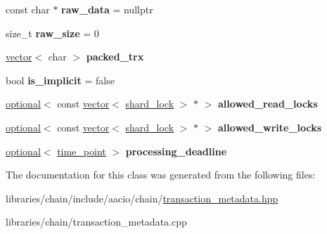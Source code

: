 \begin{DoxyCompactItemize}
const char $\ast$ {\bfseries raw\+\_\+data} = nullptr
\item 
\mbox{\label{classaacio_1_1chain_1_1transaction__metadata_a6cb9fee5c517464b981a4edef50c93be}} 
size\+\_\+t {\bfseries raw\+\_\+size} = 0
\item 
\mbox{\label{classaacio_1_1chain_1_1transaction__metadata_a115fa4fd227e7172759c1c612b4fe0af}} 
\mbox{\hyperlink{classstd_1_1vector}{vector}}$<$ char $>$ {\bfseries packed\+\_\+trx}
\item 
\mbox{\label{classaacio_1_1chain_1_1transaction__metadata_a1a34ff3c73b2740bf7ceb077b4418e35}} 
bool {\bfseries is\+\_\+implicit} = false
\item 
\mbox{\label{classaacio_1_1chain_1_1transaction__metadata_a41e662bd81a1861b2c332e345e8e086f}} 
\mbox{\hyperlink{classfc_1_1optional}{optional}}$<$ const \mbox{\hyperlink{classstd_1_1vector}{vector}}$<$ \mbox{\hyperlink{structaacio_1_1chain_1_1shard__lock}{shard\+\_\+lock}} $>$ $\ast$ $>$ {\bfseries allowed\+\_\+read\+\_\+locks}
\item 
\mbox{\label{classaacio_1_1chain_1_1transaction__metadata_ae38d363d68abd76b2bca985ada4dcd2f}} 
\mbox{\hyperlink{classfc_1_1optional}{optional}}$<$ const \mbox{\hyperlink{classstd_1_1vector}{vector}}$<$ \mbox{\hyperlink{structaacio_1_1chain_1_1shard__lock}{shard\+\_\+lock}} $>$ $\ast$ $>$ {\bfseries allowed\+\_\+write\+\_\+locks}
\item 
\mbox{\label{classaacio_1_1chain_1_1transaction__metadata_a641bb1e3fd6c47047901b83e3507c80f}} 
\mbox{\hyperlink{classfc_1_1optional}{optional}}$<$ \mbox{\hyperlink{classfc_1_1time__point}{time\+\_\+point}} $>$ {\bfseries processing\+\_\+deadline}
\end{DoxyCompactItemize}


The documentation for this class was generated from the following files\+:\begin{DoxyCompactItemize}
\item 
libraries/chain/include/aacio/chain/\mbox{\hyperlink{transaction__metadata_8hpp}{transaction\+\_\+metadata.\+hpp}}\item 
libraries/chain/transaction\+\_\+metadata.\+cpp\end{DoxyCompactItemize}
